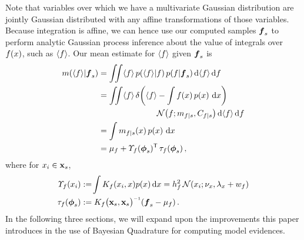 \documentclass{article}
\begin{document}
Note that variables over which we have a multivariate Gaussian distribution are jointly Gaussian distributed with any affine transformations of those variables. Because integration is affine, we can hence use our computed samples $\vf_s$ to perform analytic Gaussian process inference about the value of integrals over $f(\lfv)$, such as $\inty{f}$. Our mean estimate for $\inty{f}$ given $\vf_s$ is
%
\begin{align} \label{eq:mean_inty_f}
\mean{\inty{f}}{\vf_s}
& 
=\iint \inty{f}\,\p{\inty{f}}{f}\p{f}{\vf_s} \ud \inty{f} \,\ud f                                                                                                                                                               \nonumber\\
&
 =\iint \inty{f}\,\dd{\inty{f}}{\int f(\lfv)\,\po{\lfv}\,\ud\lfv}
\nonumber\\
&\hspace{2.5cm}
\N{f}{\meancondfn{f}{s}}{C_{f|s}} \ud \inty{f} \,\ud f \nonumber\\
&
 = \int \meancondfn{f}{s}(\lfv)\,\po{\lfv}\,\ud\lfv\nonumber\\
&
 = 
\mu_f + \ntT{s}{f}\, \dtt{s}{f}
\,,
\end{align}
where for $\lfv_i \in \vlfv_s$,
\begin{align*}
\fnt{\lfv_i}{f} & \deq \!\int K_f(\lfv_i,\lfv)\po{\lfv}\ud\lfv
 = h_f^2\,\N{\lfv_i}{\nu_{\lfv}}{\lambda_{\lfv}+w_{f}}\\
\dtt{s}{f} & \deq K_{f}\bigl(\vlfv_s,\vlfv_s\bigr)\inv (\vf_s-{\mu}_{f})\,.
\end{align*}
%
%
In the following three sections, we will expand upon the improvements this paper introduces in the use of Bayesian Quadrature for computing model evidences.
\end{document}

